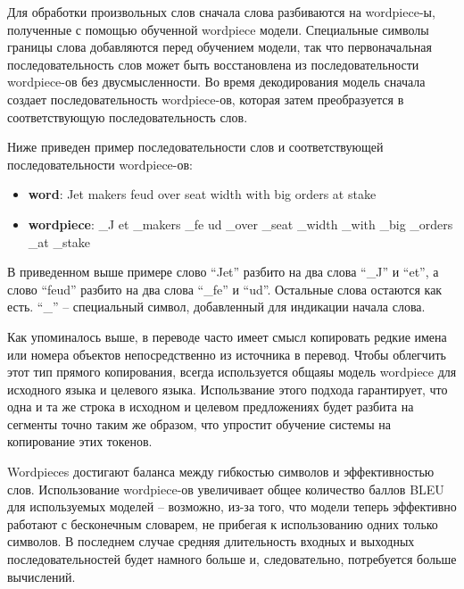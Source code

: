 \documentclass[12pt, a4paper]{article}
\begin{document}
        Для обработки произвольных слов сначала слова разбиваются на wordpiece-ы, полученные с помощью обученной wordpiece модели. Специальные символы границы слова добавляются перед обучением модели, так что первоначальная последовательность слов может быть восстановлена из последовательности wordpiece-ов без двусмысленности. Во время декодирования модель сначала создает последовательность wordpiece-ов, которая затем преобразуется в соответствующую последовательность слов.

        Ниже приведен пример последовательности слов и соответствующей последовательности wordpiece-ов:
        \begin{itemize}
            \item \textbf{word}: Jet makers feud over seat width with big orders at stake
            \item \textbf{wordpiece}: \_J et \_makers \_fe ud \_over \_seat \_width \_with \_big \_orders \_at \_stake
        \end{itemize}

        В приведенном выше примере слово ``Jet'' разбито на два слова ``\_J'' и ``et'', а слово ``feud'' разбито на два слова ``\_fe'' и ``ud''. Остальные слова остаются как есть. ``\_'' -- специальный символ, добавленный для индикации начала слова.

        Как упоминалось выше, в переводе часто имеет смысл копировать редкие имена или номера объектов непосредственно из источника в перевод. Чтобы облегчить этот тип прямого копирования, всегда используется общаяы модель wordpiece для исходного языка и целевого языка. Использвание этого подхода гарантирует, что одна и та же строка в исходном и целевом предложениях будет разбита на сегменты точно таким же образом, что упростит обучение системы на копирование этих токенов.

        Wordpieces достигают баланса между гибкостью символов и эффективностью слов. Использование wordpiece-ов увеличивает общее количество баллов BLEU для используемых моделей -- возможно, из-за того, что модели теперь эффективно работают с бесконечным словарем, не прибегая к использованию одних только символов. В последнем случае средняя длительность входных и выходных последовательностей будет намного больше и, следовательно, потребуется больше вычислений.
\end{document}
